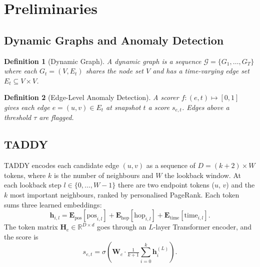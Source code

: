 \documentclass[conference]{IEEEtran}
\newtheorem{definition}{Definition}
\begin{document}
\section{Preliminaries}
\label{sec:prelim}

\subsection{Dynamic Graphs and Anomaly Detection}

\begin{definition}[Dynamic Graph]
A dynamic graph is a sequence $\mathcal{G}=\{G_1,\ldots,G_T\}$ where each
$G_t=(V,E_t)$ shares the node set $V$ and has a time-varying edge set
$E_t\subseteq V\times V$.
\end{definition}

\begin{definition}[Edge-Level Anomaly Detection]
A scorer $f:(e,t)\mapsto[0,1]$ gives each edge $e=(u,v)\in E_t$ at snapshot
$t$ a score $s_{e,t}$. Edges above a threshold $\tau$ are flagged.
\end{definition}

\subsection{TADDY}
\label{subsec:taddy}
TADDY \cite{liu2021taddy} encodes each candidate edge $(u,v)$ as a sequence of
$D=(k+2)\times W$ tokens, where $k$ is the number of neighbours and $W$ the
lookback window. At each lookback step $l\in\{0,\ldots,W{-}1\}$ there are two
endpoint tokens ($u$, $v$) and the $k$ most important neighbours, ranked by
personalised PageRank. Each token sums three learned embeddings:
\begin{equation}
\mathbf{h}_{i,l}=\mathbf{E}_{\mathrm{pos}}[\mathrm{pos}_{i,l}]+
\mathbf{E}_{\mathrm{hop}}[\mathrm{hop}_{i,l}]+
\mathbf{E}_{\mathrm{time}}[\mathrm{time}_{i,l}].
\label{eq:embed}
\end{equation}
The token matrix $\mathbf{H}_e\in\mathbb{R}^{D\times d}$ goes through an
$L$-layer Transformer encoder, and the score is
\begin{equation}
s_{e,t}=\sigma\!\left(\mathbf{W}_c\cdot
\tfrac{1}{k+1}\textstyle\sum_{i=0}^{k}\mathbf{h}^{(L)}_i\right).
\label{eq:score}
\end{equation}
\end{document}
